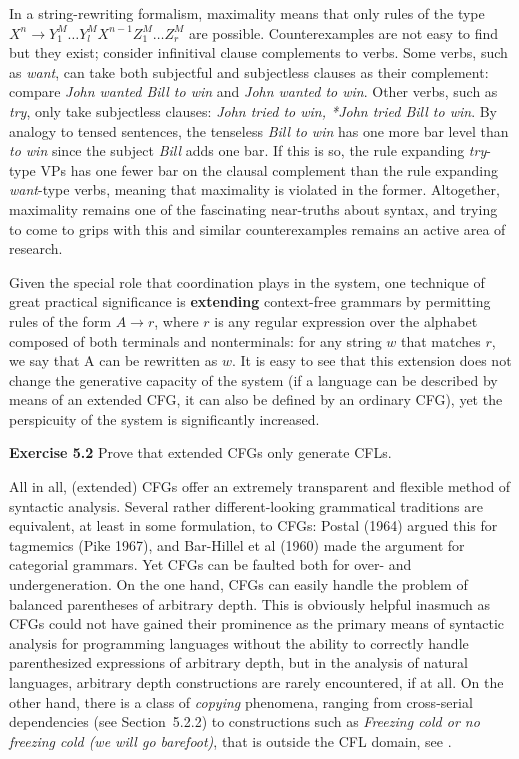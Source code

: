 In a string-rewriting formalism, maximality means that only rules of the type
$X^n \rightarrow Y_1^M \ldots Y_l^M X^{n-1} Z_1^M \ldots Z_r^M$ are possible.
Counterexamples are not easy to find but they exist; consider infinitival
clause complements to verbs. Some verbs, such as {\it want}, can take both
subjectful and subjectless clauses as their complement: compare {\it John
  wanted Bill to win} and {\it John wanted to win}. Other verbs, such as{\it
  try}, only take subjectless clauses: {\it John tried to win, *John tried Bill
  to win}.  By analogy to tensed sentences, the tenseless {\it Bill to win}
has one more bar level than {\it to win} since the subject {\it Bill} adds
one bar. If this is so, the rule expanding {\it try}-type VPs has one fewer
bar on the clausal complement than the rule expanding {\it want}-type verbs,
meaning that maximality is violated in the former. Altogether, maximality
remains one of the fascinating near-truths about syntax, and trying to come to
grips with this and similar counterexamples remains an active area of
research.

Given the special role that coordination plays in the system, one technique
of great practical significance is {\bf extending} context-free grammars by
permitting rules of the form $A \rightarrow r$, where $r$ is any regular
expression over the alphabet composed of both terminals and nonterminals: for
any string $w$ that matches $r$, we say that A can be rewritten as $w$.  It is
easy to see that this extension does not change the generative capacity of the
system (if a language can be described by means of an extended CFG, it can also
be defined by an ordinary CFG), yet the perspicuity of the system is
significantly increased.  

\smallskip
\noindent
{\bf Exercise 5.2} Prove that extended CFGs only generate CFLs. 

\smallskip
\noindent 
All in all, (extended) CFGs offer an extremely transparent and flexible method
of syntactic analysis. Several rather different-looking grammatical traditions
are equivalent, at least in some formulation, to CFGs: Postal
(1964)\nocite{Postal:1964} argued this for tagmemics (Pike
1967),\nocite{Pike:1967}\nocite{Bar-Hillel:1960} and Bar-Hillel et al (1960)
made the argument for categorial grammars. Yet CFGs can be faulted both for
over- and undergeneration. On the one hand, CFGs can easily handle the problem
of balanced parentheses of arbitrary depth.  This is obviously helpful
inasmuch as CFGs could not have gained their prominence as the primary means
of syntactic analysis for programming languages without the ability to
correctly handle parenthesized expressions of arbitrary depth, but in the
analysis of natural languages, arbitrary depth constructions are rarely
encountered, if at all. On the other hand, there is a class of {\it copying}
phenomena, ranging from cross-serial dependencies (see Section~5.2.2) to
constructions such as {\it Freezing cold or no freezing cold (we will go
  barefoot)}, that is outside the CFL domain, see 
.

